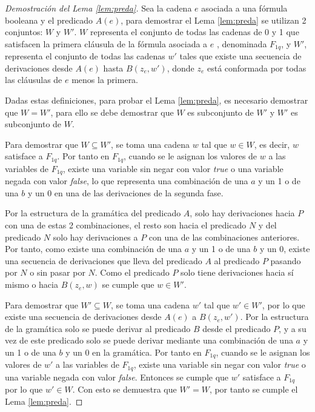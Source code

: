 \documentclass[12pt]{article}
\newcommand{\true}{\textit{true}}
\newcommand{\false}{\textit{false}}
\begin{document}
\begin{proof}[Demostración del Lema \ref{lem:preda}]
    
    Sea la cadena $e$ asociada a una fórmula booleana y el predicado $A(e)$, para demostrar el Lema \ref{lem:preda} se utilizan 2 conjuntos: $W$ y $W'$. $W$ representa el conjunto de todas las cadenas de 0 y 1 que satisfacen la primera cláusula de la fórmula asociada a $e$ , denominada $F_{1q}$, y $W'$, representa el conjunto de todas las cadenas $w'$ tales que existe una secuencia de derivaciones desde $A(e)$ hasta $B(z_e,w')$, donde $z_e$ está conformada por todas las cláusulas de $e$ menos la primera.
    
    Dadas estas definiciones, para probar el Lema \ref{lem:preda}, es necesario demostrar que $W=W'$, para ello se debe demostrar que $W$ es subconjunto de $W'$ y $W'$ es subconjunto de $W$. 
    
    Para demostrar que $W\subseteq W'$, se toma una cadena $w$ tal que $w\in W$, es decir, $w$ satisface a $F_{1q}$. 
    Por tanto en $F_{1q}$, cuando se le asignan los valores de $w$ a las variables de $F_{1q}$, existe una variable 
    sin negar con valor \true{} o una variable negada con valor \false{}, lo que representa una combinación de una $a$ y un 1 o de una $b$ y un 0 en una de las derivaciones de la segunda fase.
    
    Por la estructura de la gramática del predicado $A$, solo hay derivaciones hacia $P$ con una de estas 2 combinaciones, el resto son hacia el predicado $N$ y del predicado $N$ solo hay derivaciones a $P$ con una de las combinaciones anteriores. Por tanto, como existe una combinación de una $a$ y un 1 o de una $b$ y un 0, existe una secuencia de derivaciones que lleva del predicado $A$ al predicado $P$ pasando por $N$ o sin pasar por $N$. Como el predicado $P$ solo tiene derivaciones hacia sí mismo o hacia $B(z_e,w)$ se cumple que $w\in W'$.
    
    Para demostrar que $W'\subseteq W$, se toma una cadena $w'$ tal que $w'\in W'$, por lo que existe una secuencia de derivaciones desde $A(e)$ a $B(z_e,w')$. Por la estructura de la gramática solo se puede derivar al predicado $B$ desde el predicado $P$, y a su vez de este predicado solo se puede derivar mediante una combinación de una $a$ y un 1 o de una $b$ y un 0 en la gramática. Por tanto en $F_{1q}$, cuando se le asignan los valores de $w'$ a las variables de $F_{1q}$, existe una variable 
    sin negar con valor \true{} o una variable negada con valor \false{}.  Entonces se cumple que $w'$ satisface a $F_{1q}$ por lo que $w'\in W$. Con esto se demuestra que $W'=W$, por tanto se cumple el Lema \ref{lem:preda}.
\end{proof}
\end{document}
